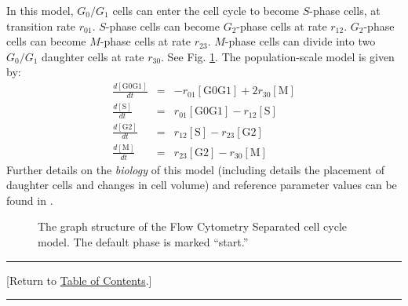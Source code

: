 \documentclass[12pt]{article}
\newcommand{\beqa}{\begin{eqnarray}}
\newcommand{\eeqa}{\end{eqnarray}}
\renewcommand{\t}[1]{\left[\mathrm{#1}\right]}
\newcommand{\TOClink}{\begin{center}\hrule\vskip-10pt\phantom{.}\hfill[Return to \hyperlink{TOC}{Table of Contents}.]\hfill\phantom{.}\vskip3pt\hrule\end{center}}
\begin{document}
In this model, $G_0/G_1$ cells can enter the cell cycle to 
become $S$-phase cells, at transition rate $r_{01}$. $S$-phase cells 
can become $G_2$-phase cells at rate $r_{12}$. 
$G_2$-phase cells can become $M$-phase cells at rate $r_{23}$. 
$M$-phase cells can divide into two $G_0/G_1$ daughter cells 
at rate $r_{30}$. 
See Fig. \ref{fig:cycle_model:flow_cytometry_separated}. The 
population-scale model is given by: 
\beqa
\frac{d\t{G0G1}}{dt} & = & -r_{01} \t{G0G1} + 2 r_{30} \t{M} \\
\frac{d\t{S}}{dt} & = &  r_{01} \t{G0G1} -r_{12} \t{S} \\
\frac{d\t{G2}}{dt} & = &  r_{12} \t{S} -r_{23} \t{G2} \\
\frac{d\t{M}}{dt} & = &  r_{23} \t{G2} -r_{30} \t{M} 
\eeqa
Further details on the \emph{biology} of this model (including 
details the placement of daughter cells and changes in cell 
volume) and reference parameter values can be found in \cite{ref:PhysiCell}. 

\begin{figure}
\begin{mdframed}[style=mystyle]
\caption{The graph structure of the Flow Cytometry Separated cell cycle model. The default phase is marked 
``start.''}
\label{fig:cycle_model:flow_cytometry_separated}
\end{mdframed}
\end{figure}

\TOClink 
\end{document}
